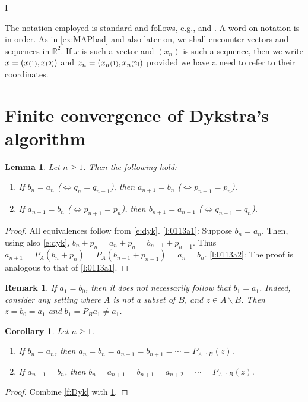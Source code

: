 I\documentclass[12pt]{article}
\newcommand{\RR}{\ensuremath{\mathbb R}}
\newtheorem{lemma}[theorem]{Lemma}
\newtheorem{corollary}[theorem]{Corollary}
\newtheorem{remark}[theorem]{Remark}
\providecommand{\RR}{\mathbb{R}}
\providecommand{\RR}{\mathbb{R}}
\newcommand{\eins}{\ensuremath{\textstyle\mathsmaller{({1})}}}
\newcommand{\zwei}{\ensuremath{\textstyle\mathsmaller{({2})}}}
\begin{document}
The notation employed is standard and follows, e.g., \cite{BC2017}
and \cite{Deutsch}. 
A word on notation is in order. 
As in \cref{ex:MAPbad} and also later on, we shall encounter 
vectors and sequences in $\RR^2$. 
If $x$ is such a vector and $(x_n)$ is such a sequence, 
then we write $x=(x\eins,x\zwei)$ and 
$x_n = (x_n\eins,x_n\zwei)$ provided we have a need to refer to their coordinates. 


\section{Finite convergence of Dykstra's algorithm}

\label{s:finite}

\begin{lemma}
\label{l:0113a}
Let $n\geq 1$.
Then the following hold: 
\begin{enumerate}
\item 
\label{l:0113a1}
If $b_n=a_n$ 
($\Leftrightarrow q_n=q_{n-1}$), 
then 
$a_{n+1} = b_n$
($\Leftrightarrow p_{n+1}=p_n$).
\item 
\label{l:0113a2}
If $a_{n+1}=b_n$
($\Leftrightarrow p_{n+1}=p_n$),
then 
$b_{n+1} = a_{n+1}$
($\Leftrightarrow q_{n+1}=q_{n}$). 
\end{enumerate}
\end{lemma}
\begin{proof}
All equivalences follow from \eqref{e:dyk}. 
\ref{l:0113a1}:
Suppose $b_n=a_n$.
Then, using also \eqref{e:dyk},
$b_n+p_n = a_n+p_n = b_{n-1}+p_{n-1}$.
Thus 
$a_{n+1} = P_A(b_n+p_n) = P_A(b_{n-1}+p_{n-1}) = a_n=b_n$. 
\ref{l:0113a2}: 
The proof is analogous to that of \cref{l:0113a1}.
\end{proof}

\begin{remark}
If $a_1=b_0$, then it does not necessarily follow that 
$b_1=a_1$.
Indeed, consider any setting where $A$ is not a subset of $B$,
and $z\in A\smallsetminus B$. 
Then $z=b_0=a_1$ and $b_1=P_Ba_1\neq a_1$.
\end{remark}

\begin{corollary}
\label{c:0113a}
Let $n\geq 1$.
\begin{enumerate}
\item 
\label{c:0113a1}
If $b_n=a_n$, 
then $a_n=b_n=a_{n+1} = b_{n+1} = \cdots = P_{A\cap B}(z)$.
\item 
\label{c:0113a2}
If $a_{n+1}=b_n$, 
then $b_n=a_{n+1} = b_{n+1} = a_{n+2} = \cdots = P_{A\cap B}(z)$.
\end{enumerate}
\end{corollary}
\begin{proof}
Combine \cref{f:Dyk} with \cref{l:0113a}.
\end{proof}
\end{document}
